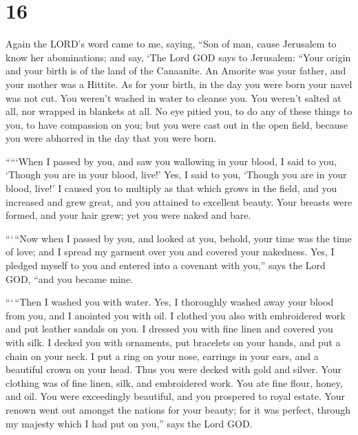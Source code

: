 \hypertarget{section-14}{%
\section{16}\label{section-14}}

 Again the LORD's word came to me, saying, 
``Son of man, cause Jerusalem to know her abominations;  and
say, `The Lord GOD says to Jerusalem: ``Your origin and your birth is of
the land of the Canaanite. An Amorite was your father, and your mother
was a Hittite.  As for your birth, in the day you were born
your navel was not cut. You weren't washed in water to cleanse you. You
weren't salted at all, nor wrapped in blankets at all.  No
eye pitied you, to do any of these things to you, to have compassion on
you; but you were cast out in the open field, because you were abhorred
in the day that you were born.

 `````When I passed by you, and saw you wallowing in your
blood, I said to you, `Though you are in your blood, live!' Yes, I said
to you, `Though you are in your blood, live!'  I caused you
to multiply as that which grows in the field, and you increased and grew
great, and you attained to excellent beauty. Your breasts were formed,
and your hair grew; yet you were naked and bare.

 ```\,``Now when I passed by you, and looked at you, behold,
your time was the time of love; and I spread my garment over you and
covered your nakedness. Yes, I pledged myself to you and entered into a
covenant with you,'' says the Lord GOD, ``and you became mine.

 ```\,``Then I washed you with water. Yes, I thoroughly
washed away your blood from you, and I anointed you with oil.
 I clothed you also with embroidered work and put leather
sandals on you. I dressed you with fine linen and covered you with silk.
 I decked you with ornaments, put bracelets on your hands,
and put a chain on your neck.  I put a ring on your nose,
earrings in your ears, and a beautiful crown on your head. 
Thus you were decked with gold and silver. Your clothing was of fine
linen, silk, and embroidered work. You ate fine flour, honey, and oil.
You were exceedingly beautiful, and you prospered to royal estate.
 Your renown went out amongst the nations for your beauty;
for it was perfect, through my majesty which I had put on you,'' says
the Lord GOD.

